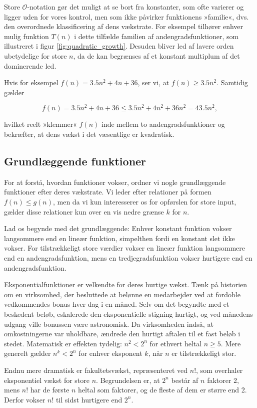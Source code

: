 Store $\mathcal{O}$-notation gør det muligt at se bort fra konstanter, som ofte varierer og ligger uden for vores kontrol, men som ikke påvirker funktionens »familie«, dvs. den overordnede klassificering af dens vækstrate. For eksempel tilhører enhver mulig funktion $T(n)$ i dette tilfælde familien af andengradsfunktioner, som illustreret i figur \ref{fig:quadratic_growth}. Desuden bliver led af lavere orden ubetydelige for store $n$, da de kan begrænses af et konstant multiplum af det dominerende led. 

Hvis for eksempel $f(n) = 3.5n^2 + 4n + 36$, ser vi, at $f(n) \geq 3.5n^2$. Samtidig gælder

\[
f(n) = 3.5n^2 + 4n + 36 \leq 3.5n^2 + 4n^2 + 36n^2 = 43.5n^2,
\]

hvilket reelt »klemmer« $f(n)$ inde mellem to andengradsfunktioner og bekræfter, at dens vækst i det væsentlige er kvadratisk.

\subsection*{Grundlæggende funktioner}
For at forstå, hvordan funktioner vokser, ordner vi nogle grundlæggende funktioner efter deres vækstrate. Vi leder efter relationer på formen \( f(n) \leq g(n) \), men da vi kun interesserer os for opførslen for store input, gælder disse relationer kun over en vis nedre grænse \( k \) for \( n \).

Lad os begynde med det grundlæggende: Enhver konstant funktion vokser langsommere end en lineær funktion, simpelthen fordi en konstant slet ikke vokser. For tilstrækkeligt store værdier vokser en lineær funktion langsommere end en andengradsfunktion, mens en tredjegradsfunktion vokser hurtigere end en andengradsfunktion.

Eksponentialfunktioner er velkendte for deres hurtige vækst. Tænk på historien om en virksomhed, der besluttede at belønne en medarbejder ved at fordoble vedkommendes bonus hver dag i en måned. Selv om det begyndte med et beskedent beløb, eskalerede den eksponentielle stigning hurtigt, og ved månedens udgang ville bonussen være astronomisk. Da virksomheden indså, at omkostningerne var uholdbare, ændrede den hurtigt aftalen til et fast beløb i stedet. Matematisk er effekten tydelig: \( n^2 < 2^n \) for ethvert heltal \( n \geq 5 \). Mere generelt gælder \( n^k < 2^n \) for enhver eksponent \( k \), når \( n \) er tilstrækkeligt stor.

Endnu mere dramatisk er fakultetsvækst, repræsenteret ved \( n! \), som overhaler eksponentiel vækst for store \( n \). Begrundelsen er, at \( 2^n \) består af \( n \) faktorer 2, mens \( n! \) har de første \( n \) heltal som faktorer, og de fleste af dem er større end 2. Derfor vokser \( n! \) til sidst hurtigere end \( 2^n \). 

